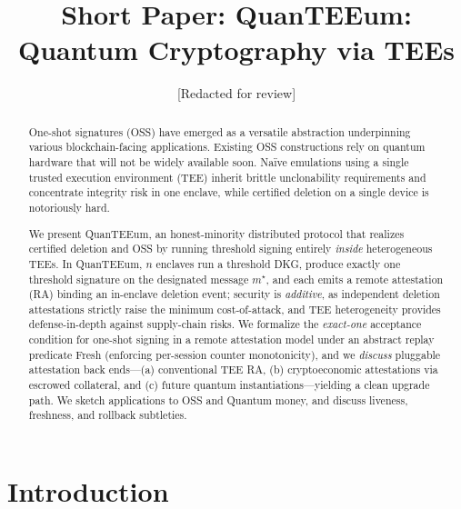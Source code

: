 \documentclass[runningheads,orivec]{llncs}
\newcommand{\prot}{\textsf{QuanTEEum}}
\begin{document}
\title{Short Paper: QuanTEEum: Quantum Cryptography via TEEs}
\author{[Redacted for review]}
\maketitle

\begin{abstract}
One-shot signatures (OSS) have emerged as a versatile abstraction underpinning various blockchain-facing applications. Existing OSS constructions rely on quantum hardware that will not be widely available soon. Naïve emulations using a single trusted execution environment (TEE) inherit brittle unclonability requirements and concentrate integrity risk in one enclave, while certified deletion on a single device is notoriously hard. 

We present \prot{}, an honest-minority distributed protocol that realizes certified deletion and OSS by running threshold signing entirely \emph{inside} heterogeneous TEEs. In \prot{}, $n$ enclaves run a threshold DKG, produce exactly one threshold signature on the designated message $m^{\star}$, and each emits a remote attestation (RA) binding an in-enclave deletion event; security is \emph{additive}, as independent deletion attestations strictly raise the minimum cost\mbox{-}of\mbox{-}attack, and TEE heterogeneity provides defense-in-depth against supply-chain risks. We formalize the \emph{exact-one} acceptance condition for one-shot signing in a remote attestation model under an abstract replay predicate \textsf{Fresh} (enforcing per-session counter monotonicity), and we \emph{discuss} pluggable attestation back ends—(a) conventional TEE RA, (b) cryptoeconomic attestations via escrowed collateral, and (c) future quantum instantiations—yielding a clean upgrade path. We sketch applications to OSS and Quantum money, and discuss liveness, freshness, and rollback subtleties. 
\end{abstract}

\section{Introduction}
\end{document}
